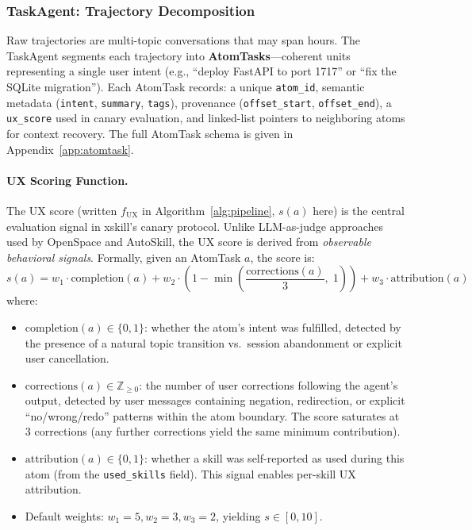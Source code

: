 \documentclass{article}
\begin{document}
\subsubsection{TaskAgent: Trajectory Decomposition}

Raw trajectories are multi-topic conversations that may span hours. The TaskAgent segments each trajectory into \textbf{AtomTasks}---coherent units representing a single user intent (e.g., ``deploy FastAPI to port 1717'' or ``fix the SQLite migration''). Each AtomTask records: a unique \texttt{atom\_id}, semantic metadata (\texttt{intent}, \texttt{summary}, \texttt{tags}), provenance (\texttt{offset\_start}, \texttt{offset\_end}), a \texttt{ux\_score} used in canary evaluation, and linked-list pointers to neighboring atoms for context recovery. The full AtomTask schema is given in Appendix~\ref{app:atomtask}.

\paragraph{UX Scoring Function.} The UX score (written $f_{\mathrm{UX}}$ in Algorithm~\ref{alg:pipeline}, $s(a)$ here) is the central evaluation signal in xskill's canary protocol. Unlike LLM-as-judge approaches used by OpenSpace and AutoSkill, the UX score is derived from \emph{observable behavioral signals}. Formally, given an AtomTask $a$, the score is:
\begin{equation}
\label{eq:ux}
s(a) = w_1 \cdot \mathrm{completion}(a) + w_2 \cdot \left(1 - \min\!\left(\frac{\mathrm{corrections}(a)}{3},\; 1\right)\right) + w_3 \cdot \mathrm{attribution}(a)
\end{equation}
where:
\begin{itemize}
    \item $\mathrm{completion}(a) \in \{0, 1\}$: whether the atom's intent was fulfilled, detected by the presence of a natural topic transition vs.\ session abandonment or explicit user cancellation.
    \item $\mathrm{corrections}(a) \in \mathbb{Z}_{\geq 0}$: the number of user corrections following the agent's output, detected by user messages containing negation, redirection, or explicit ``no/wrong/redo'' patterns within the atom boundary. The score saturates at 3 corrections (any further corrections yield the same minimum contribution).
    \item $\mathrm{attribution}(a) \in \{0, 1\}$: whether a skill was self-reported as used during this atom (from the \texttt{used\_skills} field). This signal enables per-skill UX attribution.
    \item Default weights: $w_1 = 5, w_2 = 3, w_3 = 2$, yielding $s \in [0, 10]$.
\end{itemize}
\end{document}
